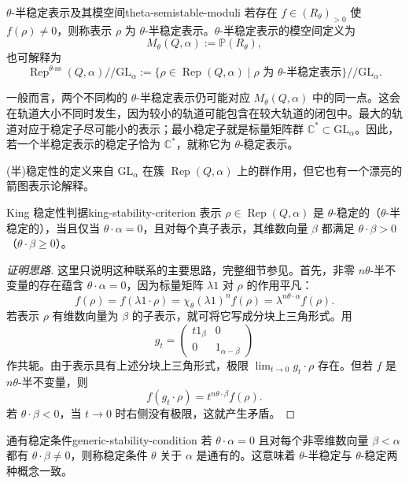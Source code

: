 \begin{definition}{$\theta$-半稳定表示及其模空间}{theta-semistable-moduli}
若存在 $f\in(R_\theta)_{>0}$ 使 $f(\rho)\ne0$，则称表示 $\rho$ 为 $\theta$-半稳定表示。$\theta$-半稳定表示的模空间定义为
\[
  M_\theta(Q,\alpha):=\mathbb P(R_\theta),
\]
也可解释为
\[
  \operatorname{Rep}^{\theta\text{-ss}}(Q,\alpha)//\mathrm{GL}_\alpha
  :=\{\rho\in\operatorname{Rep}(Q,\alpha)\mid\rho\text{ 为 }\theta\text{-半稳定表示}\}//\mathrm{GL}_\alpha.
\]
\end{definition}

一般而言，两个不同构的 $\theta$-半稳定表示仍可能对应 $M_\theta(Q,\alpha)$ 中的同一点。这会在轨道大小不同时发生，因为较小的轨道可能包含在较大轨道的闭包中。最大的轨道对应于稳定子尽可能小的表示；最小稳定子就是标量矩阵群 $\mathbb C^*\subset\mathrm{GL}_\alpha$。因此，若一个半稳定表示的稳定子恰为 $\mathbb C^*$，就称它为 $\theta$-稳定表示。

(半)稳定性的定义来自 $\mathrm{GL}_\alpha$ 在簇 $\operatorname{Rep}(Q,\alpha)$ 上的群作用，但它也有一个漂亮的箭图表示论解释。

\begin{theorem}{King 稳定性判据}{king-stability-criterion}
表示 $\rho\in\operatorname{Rep}(Q,\alpha)$ 是 $\theta$-稳定的（$\theta$-半稳定的），当且仅当 $\theta\cdot\alpha=0$，且对每个真子表示，其维数向量 $\beta$ 都满足 $\theta\cdot\beta>0$（$\theta\cdot\beta\geq0$）。
\end{theorem}
\begin{proof}[证明思路]
这里只说明这种联系的主要思路，完整细节参见。首先，非零 $n\theta$-半不变量的存在蕴含 $\theta\cdot\alpha=0$，因为标量矩阵 $\lambda 1$ 对 $\rho$ 的作用平凡：
\[
  f(\rho)=f(\lambda1\cdot\rho)=\chi_\theta(\lambda1)^n f(\rho)
  =\lambda^{n\theta\cdot\alpha}f(\rho).
\]
若表示 $\rho$ 有维数向量为 $\beta$ 的子表示，就可将它写成分块上三角形式。用
\[
  g_t=\begin{pmatrix}t1_\beta&0\\0&1_{\alpha-\beta}\end{pmatrix}
\]
作共轭。由于表示具有上述分块上三角形式，极限 $\lim_{t\to0}g_t\cdot\rho$ 存在。但若 $f$ 是 $n\theta$-半不变量，则
\[
  f(g_t\cdot\rho)=t^{n\theta\cdot\beta}f(\rho).
\]
若 $\theta\cdot\beta<0$，当 $t\to0$ 时右侧没有极限，这就产生矛盾。
\end{proof}

\begin{definition}{通有稳定条件}{generic-stability-condition}
若 $\theta\cdot\alpha=0$ 且对每个非零维数向量 $\beta<\alpha$ 都有 $\theta\cdot\beta\ne0$，则称稳定条件 $\theta$ 关于 $\alpha$ 是通有的。这意味着 $\theta$-半稳定与 $\theta$-稳定两种概念一致。
\end{definition}

